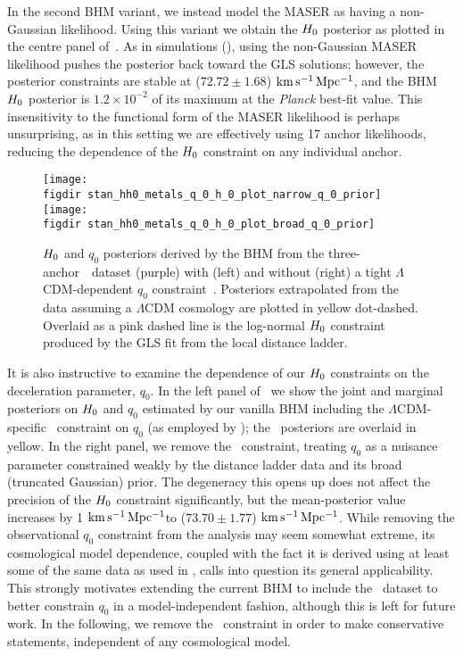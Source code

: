 \documentclass[a4paper,fleqn,usenatbib]{mnras}
\newcommand{\riess}{\citetalias{Riess_etal:2016}}
\newcommand{\decel}{\ensuremath{q_0}}
\newcommand{\kmsmpc}{\ensuremath{{\rm km\,s^{-1}\,Mpc^{-1}}}}
\begin{document}
{In the second BHM variant, we instead model the MASER as having a non-Gaussian likelihood. Using this variant we obtain the $H_0$ posterior as plotted in the centre panel of~. As in simulations (), using the non-Gaussian MASER likelihood pushes the posterior back toward the GLS solutions; however, the posterior constraints are stable at ($72.72 \pm 1.68$) \kmsmpc, and the BHM $H_0$ posterior is $1.2\times10^{-2}$ of its maximum at the {\it Planck} best-fit value. This insensitivity to the functional form of the MASER likelihood is perhaps unsurprising, as in this setting we are effectively using 17 anchor likelihoods, reducing the dependence of the $H_0$ constraint on any individual anchor.

\begin{figure*}
\texttt{[image: \\figdir stan\_hh0\_metals\_q\_0\_h\_0\_plot\_narrow\_q\_0\_prior]}
\texttt{[image: \\figdir stan\_hh0\_metals\_q\_0\_h\_0\_plot\_broad\_q\_0\_prior]}
\caption{$H_0$ and $\decel$ posteriors derived by the BHM from the three-anchor~\protect\riess\ dataset (purple) with (left) and without (right) a tight $\Lambda$CDM-dependent $\decel$ constraint~\citep{Betoule_etal:2014}. Posteriors extrapolated from the~\citet{Planck_XIII:2016} data assuming a $\Lambda$CDM cosmology are plotted in yellow dot-dashed. Overlaid as a pink dashed line is the log-normal $H_0$ constraint produced by the GLS fit from the local distance ladder.}
\label{figure:gauss_q_0_dep}
\end{figure*}

It is also instructive to examine the dependence of our $H_0$ constraints on the deceleration parameter, $\decel$. In the left panel of~ we show the joint and marginal posteriors on $H_0$ and $\decel$ estimated by our vanilla BHM including the $\Lambda$CDM-specific~\citet{Betoule_etal:2014} constraint on $\decel$ (as employed by \riess); the~\citet{Planck_XIII:2016} posteriors are overlaid in yellow. In the right panel, we remove the~\citet{Betoule_etal:2014} constraint, treating $\decel$ as a nuisance parameter constrained weakly by the distance ladder data and its broad (truncated Gaussian) prior. The degeneracy this opens up does not affect the precision of the $H_0$ constraint significantly, but the mean-posterior value increases by 1 \kmsmpc to ($73.70 \pm 1.77$) \kmsmpc. While removing the observational $\decel$ constraint from the analysis may seem somewhat extreme, its cosmological model dependence, coupled with the fact it is derived using at least some of the same data as used in \riess, calls into question its general applicability. This strongly motivates extending the current BHM to include the~\citet{Betoule_etal:2014} dataset to better constrain $\decel$ in a model-independent fashion, although this is left for future work. In the following, we remove the~\citet{Betoule_etal:2014} constraint in order to make conservative statements, independent of any cosmological model.

}
\end{document}
